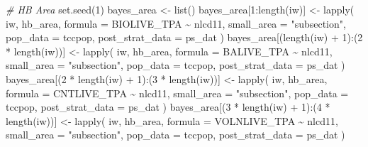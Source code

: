 \documentclass[12pt,twoside]{reedthesis}
\newenvironment{Shaded}{\begin{snugshade}}{\end{snugshade}}
\newcommand{\AttributeTok}[1]{\textcolor[rgb]{0.77,0.63,0.00}{#1}}
\newcommand{\CommentTok}[1]{\textcolor[rgb]{0.56,0.35,0.01}{\textit{#1}}}
\newcommand{\DecValTok}[1]{\textcolor[rgb]{0.00,0.00,0.81}{#1}}
\newcommand{\FunctionTok}[1]{\textcolor[rgb]{0.00,0.00,0.00}{#1}}
\newcommand{\NormalTok}[1]{#1}
\newcommand{\OtherTok}[1]{\textcolor[rgb]{0.56,0.35,0.01}{#1}}
\newcommand{\SpecialCharTok}[1]{\textcolor[rgb]{0.00,0.00,0.00}{#1}}
\newcommand{\StringTok}[1]{\textcolor[rgb]{0.31,0.60,0.02}{#1}}
\begin{document}
\begin{Shaded}
\begin{Highlighting}[]
\CommentTok{\# HB Area}
\FunctionTok{set.seed}\NormalTok{(}\DecValTok{1}\NormalTok{)}
\NormalTok{bayes\_area }\OtherTok{\textless{}{-}} \FunctionTok{list}\NormalTok{()}
\NormalTok{bayes\_area[}\DecValTok{1}\SpecialCharTok{:}\FunctionTok{length}\NormalTok{(iw)] }\OtherTok{\textless{}{-}}
  \FunctionTok{lapply}\NormalTok{(}
\NormalTok{    iw,}
\NormalTok{    hb\_area,}
    \AttributeTok{formula =}\NormalTok{ BIOLIVE\_TPA }\SpecialCharTok{\textasciitilde{}}\NormalTok{ nlcd11,}
    \AttributeTok{small\_area =} \StringTok{"subsection"}\NormalTok{,}
    \AttributeTok{pop\_data =}\NormalTok{ tccpop,}
    \AttributeTok{post\_strat\_data =}\NormalTok{ ps\_dat}
\NormalTok{  )}
\NormalTok{bayes\_area[(}\FunctionTok{length}\NormalTok{(iw) }\SpecialCharTok{+} \DecValTok{1}\NormalTok{)}\SpecialCharTok{:}\NormalTok{(}\DecValTok{2} \SpecialCharTok{*} \FunctionTok{length}\NormalTok{(iw))] }\OtherTok{\textless{}{-}}
  \FunctionTok{lapply}\NormalTok{(}
\NormalTok{    iw,}
\NormalTok{    hb\_area,}
    \AttributeTok{formula =}\NormalTok{ BALIVE\_TPA }\SpecialCharTok{\textasciitilde{}}\NormalTok{ nlcd11,}
    \AttributeTok{small\_area =} \StringTok{"subsection"}\NormalTok{,}
    \AttributeTok{pop\_data =}\NormalTok{ tccpop,}
    \AttributeTok{post\_strat\_data =}\NormalTok{ ps\_dat}
\NormalTok{  )}
\NormalTok{bayes\_area[(}\DecValTok{2} \SpecialCharTok{*} \FunctionTok{length}\NormalTok{(iw) }\SpecialCharTok{+} \DecValTok{1}\NormalTok{)}\SpecialCharTok{:}\NormalTok{(}\DecValTok{3} \SpecialCharTok{*} \FunctionTok{length}\NormalTok{(iw))] }\OtherTok{\textless{}{-}}
  \FunctionTok{lapply}\NormalTok{(}
\NormalTok{    iw,}
\NormalTok{    hb\_area,}
    \AttributeTok{formula =}\NormalTok{ CNTLIVE\_TPA }\SpecialCharTok{\textasciitilde{}}\NormalTok{ nlcd11,}
    \AttributeTok{small\_area =} \StringTok{"subsection"}\NormalTok{,}
    \AttributeTok{pop\_data =}\NormalTok{ tccpop,}
    \AttributeTok{post\_strat\_data =}\NormalTok{ ps\_dat}
\NormalTok{  )}
\NormalTok{bayes\_area[(}\DecValTok{3} \SpecialCharTok{*} \FunctionTok{length}\NormalTok{(iw) }\SpecialCharTok{+} \DecValTok{1}\NormalTok{)}\SpecialCharTok{:}\NormalTok{(}\DecValTok{4} \SpecialCharTok{*} \FunctionTok{length}\NormalTok{(iw))] }\OtherTok{\textless{}{-}}
  \FunctionTok{lapply}\NormalTok{(}
\NormalTok{    iw,}
\NormalTok{    hb\_area,}
    \AttributeTok{formula =}\NormalTok{ VOLNLIVE\_TPA }\SpecialCharTok{\textasciitilde{}}\NormalTok{ nlcd11,}
    \AttributeTok{small\_area =} \StringTok{"subsection"}\NormalTok{,}
    \AttributeTok{pop\_data =}\NormalTok{ tccpop,}
    \AttributeTok{post\_strat\_data =}\NormalTok{ ps\_dat}
\NormalTok{  )}


\end{Highlighting}
\end{Shaded}
\end{document}
